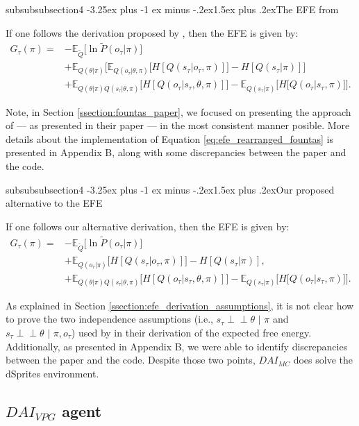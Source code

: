 \documentclass[twoside,11pt]{article}
\makeatletter
\newcommand{\indep}{\perp \! \! \! \perp}
\newcounter{subsubsubsection}[subsubsection]
\def\subsubsubsection{\@startsection
     {subsubsubsection}{4}{\z@} {-3.25ex plus -1
     ex minus -.2ex}{1.5ex plus .2ex}{\normalsize\bf}}
\makeatother
\begin{document}
\subsubsubsection{The EFE from \citet{DeepAIwithMCMC}}

If one follows the derivation proposed by \citet{DeepAIwithMCMC}, then the EFE is given by:
\begin{align}
G_{\tau}(\pi) = &- \mathbb{E}_{\tilde{Q}}\Big[ \ln \tilde{P}(o_\tau|\pi)\Big]\nonumber\\
&+ \mathbb{E}_{Q(\theta|\pi)}\Big[ \mathbb{E}_{Q(o_\tau|\theta,\pi)}\big[H[Q(s_\tau|o_\tau, \pi)]\big] - H[Q(s_\tau|\pi)] \Big]\nonumber\\
&+ \mathbb{E}_{Q(\theta|\pi)Q(s_\tau|\theta,\pi)}\Big[H[Q(o_\tau|s_\tau,\theta,\pi)] \Big] - \mathbb{E}_{Q(s_\tau|\pi)}\Big[ H\big[ Q(o_\tau|s_\tau, \pi) \big] \Big].\label{eq:efe_rearranged_fountas}
\end{align}

\noindent Note, in Section \ref{ssection:fountas_paper}, we focused on presenting the approach of \citet{DeepAIwithMCMC} --- as presented in their paper --- in the most consistent manner posible. More details about the implementation of Equation \ref{eq:efe_rearranged_fountas} is presented in Appendix B, along with some discrepancies between the paper and the code.

\subsubsubsection{Our proposed alternative to the EFE}

If one follows our alternative derivation, then the EFE is given by:
\begin{align*}
G_{\tau}(\pi) = &- \mathbb{E}_{\tilde{Q}}\Big[ \ln \tilde{P}(o_\tau|\pi)\Big]\\
&+ \mathbb{E}_{Q(o_\tau|\pi)}\Big[ H[Q(s_\tau|o_\tau, \pi)] \Big] - H[Q(s_\tau|\pi)],\\
&+ \mathbb{E}_{Q(\theta|\pi)Q(s_\tau|\theta,\pi)}\Big[H[Q(o_\tau|s_\tau,\theta,\pi)] \Big] - \mathbb{E}_{Q(s_\tau|\pi)}\Big[ H\big[ Q(o_\tau|s_\tau, \pi) \big] \Big].
\end{align*}

\noindent As explained in Section \ref{ssection:efe_derivation_assumptions}, it is not clear how to prove the two independence assumptions (i.e., $s_\tau \indep \theta \,\,|\,\, \pi$ and $s_\tau \indep \theta \,\,| \,\,\pi, o_\tau$) used by \citet{DeepAIwithMCMC} in their derivation of the expected free energy. Additionally, as presented in Appendix B, we were able to identify discrepancies between the paper and the code. Despite those two points, $DAI_{MC}$ does solve the dSprites environment.

\subsection{$DAI_{VPG}$ agent \citep{DeepAI}}
\end{document}
